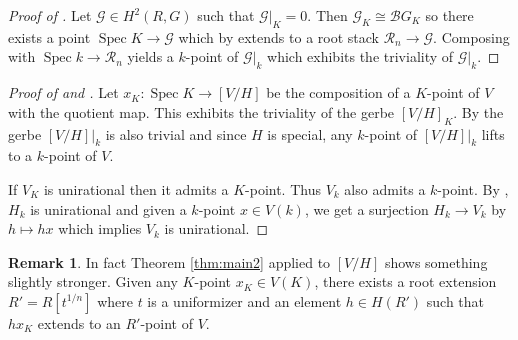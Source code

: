 \documentclass{amsart}
\theoremstyle{definition}
\newtheorem{remark}[remark]{Remark}
\newcommand{\cG}{\mathcal{G}}
\newcommand{\cB}{\mathcal{B}}
\newcommand{\cR}{\mathcal{R}}
\newcommand{\spec}{\operatorname{Spec}}
\begin{document}
\begin{proof}[Proof of ] Let $\cG \in H^2(R,G)$ such that $\cG|_K = 0$. Then $\cG_K \cong \cB G_K$ so there exists a point $\spec K \to \cG$ which by  extends to a root stack $\cR_n \to \cG$. Composing with $\spec k \to \cR_n$ yields a $k$-point of $\cG|_k$ which exhibits the triviality of $\cG|_k$. 
\end{proof}

\begin{proof}[Proof of  and ] Let $x_K : \spec K \to [V/H]$ be the composition of a $K$-point of $V$ with the quotient map. This exhibits the triviality of the gerbe $[V/H]_K$. By  the gerbe $[V/H]|_k$ is also trivial and since $H$ is special, any $k$-point of $[V/H]|_k$ lifts to a $k$-point of $V$. 

If $V_K$ is unirational then it admits a $K$-point. Thus $V_k$ also admits a $k$-point. By \cite[Theorem 18.2(ii)]{borel}, $H_k$ is unirational and given a $k$-point $x \in V(k)$, we get a surjection $H_k \to V_k$ by $h \mapsto hx$ which implies $V_k$ is unirational. 
\end{proof}

\begin{remark} In fact Theorem \ref{thm:main2} applied to $[V/H]$ shows something slightly stronger. Given any $K$-point $x_K \in V(K)$, there exists a root extension $R'=R[t^{1/n}]$ where $t$ is a uniformizer and an element $h \in H(R')$ such that $hx_K$ extends to an $R'$-point of $V$. 
\end{remark}
\end{document}
